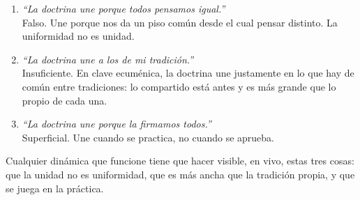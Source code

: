 \documentclass[11pt, a4paper]{article}
\begin{document}
\begin{enumerate}[label={\color{doctrinaAzul}\arabic*.}]
  \item \emph{``La doctrina une porque todos pensamos igual.''} \\
        Falso. Une porque nos da un piso común desde el cual pensar distinto. La uniformidad no es unidad.
  \item \emph{``La doctrina une a los de mi tradición.''} \\
        Insuficiente. En clave ecuménica, la doctrina une justamente en lo que hay de común entre tradiciones: lo compartido está antes y es más grande que lo propio de cada una.
  \item \emph{``La doctrina une porque la firmamos todos.''} \\
        Superficial. Une cuando se practica, no cuando se aprueba.
\end{enumerate}

Cualquier dinámica que funcione tiene que hacer visible, en vivo, estas tres cosas: que la unidad no es uniformidad, que es más ancha que la tradición propia, y que se juega en la práctica.

\vspace{1.5em}
\end{document}
